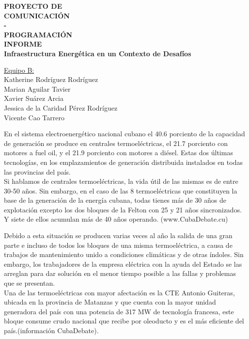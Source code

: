 \documentclass{article}
\begin{document}
\begin{titlepage}
    \centering
    \Huge{\bfseries{PROYECTO DE \\
    COMUNICACIÓN\\
    -\\
    PROGRAMACIÓN}}\\
    \vspace{3cm}
    \large{\bfseries{INFORME}}\\
    \vspace{1.5cm}
    \large{\bfseries{Infraestructura Energética en un Contexto de Desafíos}}
    
    \vspace{1.5cm}
    \underline{Equipo B:}\\
    Katherine Rodríguez Rodríguez\\
    Marian Aguilar Tavier\\
    Xavier Suárez Arcia\\
    Jessica de la Caridad Pérez Rodríguez\\
    Vicente Cao Tarrero
\end{titlepage}
En el sistema electroenergético nacional cubano el 40.6 porciento de la capacidad de generación se produce en centrales termoeléctricas, el 21.7 porciento con motores a fuel oil, y el 21.9 porciento con motores a diésel. Estas dos últimas tecnologías, en los emplazamientos de generación distribuida instalados en todas las provincias del país.\\
Si hablamos de centrales termoeléctricas, la vida útil de las mismas es de entre 30-50 años. Sin embargo, en el caso de las 8 termoeléctricas que constituyen la base de la generación de la energía cubana, todas tienes más de 30 años de explotación excepto los dos bloques de la Felton con 25 y 21 años sincronizados. Y siete de ellos acumulan más de 40 años operando.
(www.CubaDebate.cu)\\ 

\vspace{0.5cm}

Debido a esta situación se producen varias veces al año la salida de una gran parte e incluso de todos los bloques de una misma termoeléctrica, a causa de trabajos de mantenimiento unido a condiciones climáticas y de otras índoles. Sin embargo, los trabajadores de la empresa eléctrica con la ayuda del Estado se las arreglan para dar solución en el menor tiempo posible a las fallas y problemas que se presentan.\\
Una de las termoeléctricas con mayor afectación es la CTE Antonio Guiteras, ubicada en la provincia de Matanzas y que cuenta con la mayor unidad generadora del país con una potencia de 317 MW de tecnología francesa, este bloque consume crudo nacional que recibe por oleoducto y es el más eficiente del país.(información CubaDebate).\\
\end{document}
